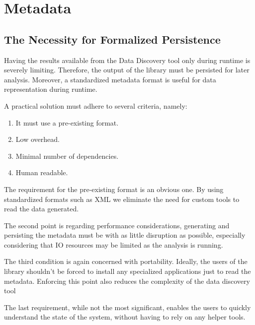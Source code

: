 \section{Metadata}
\subsection{The Necessity for Formalized Persistence}

Having the results available from the Data Discovery tool only during runtime is severely limiting.
Therefore, the output of the library must be persisted for later analysis.
Moreover, a standardized
metadata format is useful for data representation during runtime.
\newline

A practical solution must adhere to several criteria, namely:
\begin{enumerate}
    \item It must use a pre-existing format.
    \item Low overhead.
    \item Minimal number of dependencies.
    \item Human readable.
\end{enumerate}

The requirement for the pre-existing format is an obvious one.
By using standardized formats such as XML we eliminate the need for custom tools to read the
data generated.

The second point is regarding performance considerations, generating and persisting the metadata must be
with as little disruption as possible, especially considering that IO resources may be limited as the
analysis is running.

The third condition is again concerned with portability.
Ideally, the users of the library shouldn't be
forced to install any specialized applications just to read the metadata.
Enforcing this point also reduces the complexity of the data discovery tool


The last requirement, while not the most significant, enables the users to quickly understand the
state of the system, without having to rely on any helper tools.
